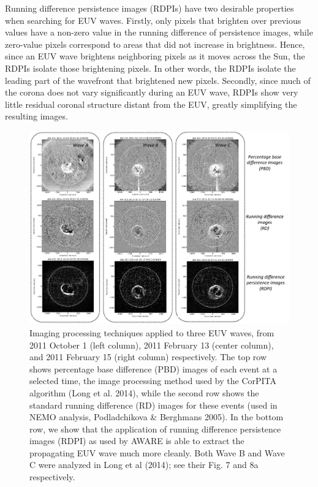 Running difference persistence images (RDPIs) have two desirable properties when searching for EUV waves.  Firstly, only pixels that brighten over previous values have a non-zero value in the running difference of persistence images, while zero-value pixels correspond to areas that did not increase in brightness. Hence, since an EUV wave brightens neighboring pixels as it moves across the Sun, the RDPIs isolate those brightening pixels.  In other words, the RDPIs isolate the leading part of the wavefront that brightened new pixels.  Secondly, since much of the corona does not vary significantly during an EUV wave, RDPIs show very little residual coronal structure distant from the EUV, greatly simplifying the resulting images.  

\begin{figure}
\begin{center}
\includegraphics[width=16cm]{aware_rdpm_figure_v3.pdf}
\caption{Imaging processing techniques applied to three EUV waves, from 2011 October 1 (left column), 2011 February 13 (center column), and 2011 February 15 (right column) respectively. The top row shows percentage base difference (PBD) images of each event at a selected time, the image processing method used by the CorPITA algorithm (Long et al. 2014), while the second row shows the standard running difference (RD) images for these events (used in NEMO analysis, Podladchikova & Berghmans 2005). In the bottom row, we show that the application of running difference persistence images (RDPI) as used by AWARE is able to extract the propagating EUV wave much more cleanly. Both Wave B and Wave C were analyzed in Long et al (2014); see their Fig. 7 and 8a respectively.}
\label{rpdm_figure}
\end{center}
\end{figure}


